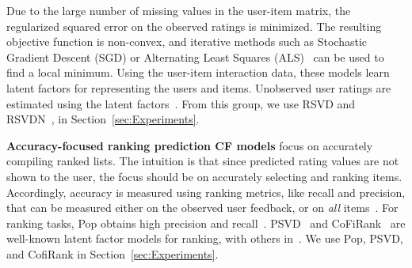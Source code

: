Due to the large number of missing values in the user-item matrix,  the  regularized squared error on the observed ratings is minimized. The resulting objective function is  non-convex, and iterative methods such as Stochastic Gradient Descent (SGD) or Alternating Least Squares (ALS)~\cite{koren2009matrix, mnih2007probabilistic,rendle:tist2012} %
 can be used to find a local minimum.
\else
Using the user-item interaction data, these models learn latent factors for representing the users and items. Unobserved user ratings are estimated using the latent factors~\cite{koren2009matrix, mnih2007probabilistic,rendle:tist2012,zhuang2013fast}.   
\fi 
From this group, we use  RSVD and RSVDN~\cite{koren2009matrix,zhuang2013fast}, in Section~\ref{sec:Experiments}.
  
 
\vspace{2mm}
\noindent \textbf{Accuracy-focused ranking prediction CF models} focus on accurately compiling ranked lists.  
The intuition is that since predicted rating values are not shown to the user, the focus should be on accurately selecting and ranking items.
Accordingly, accuracy is measured using  ranking metrics,  like recall and precision,  that can be   measured either on the observed  user feedback, or on \emph{all} items~\cite{cremonesi2010performance,steck2013evaluation}. 
For ranking tasks, Pop obtains high precision and recall~\cite{cremonesi2010performance,vargas2014improving}. PSVD~\cite{cremonesi2010performance} and CoFiRank~\cite{weimer2007maximum} are well-known  latent factor models for ranking,  with others in~\cite{balakrishnan2012collaborative,lee2014local}. We use Pop, PSVD, and CofiRank in  Section~\ref{sec:Experiments}.



